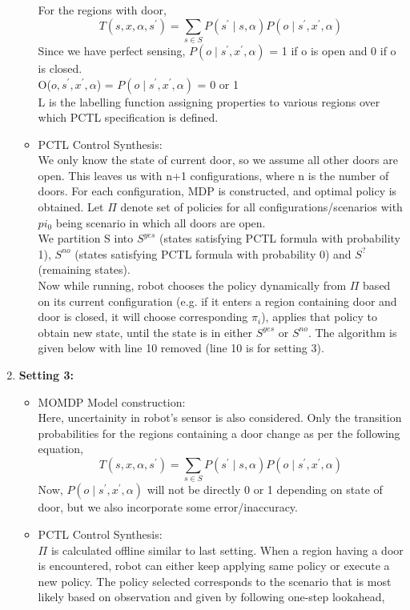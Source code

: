 \documentclass{article}
\theoremstyle{definition}
\begin{document}
\begin{enumerate}
\begin{itemize}
        For the regions with door,
        \[ T(s,x,\alpha,s^{'}) = \sum_{s\in S} P(s^{'}\mid s,\alpha) P(o \mid s^{'},x^{'},\alpha) \]
        Since we have perfect sensing, $P(o \mid s^{'},x^{'},\alpha)$ = 1 if o is open and 0 if o is closed.\\
        O($o, s^{'},x^{'},\alpha$) = $P(o \mid s^{'},x^{'},\alpha)$ = 0 or 1\\
        L is the labelling function assigning properties to various regions over which PCTL specification is defined.
        \item PCTL Control Synthesis:\\
        We only know the state of current door, so we assume all other doors are open. This leaves us with n+1 configurations, where n is the number of doors. For each configuration, MDP is constructed, and optimal policy is obtained. Let $\Pi$ denote set of policies for all configurations/scenarios with $pi_0$ being scenario in which all doors are open.\\
        We partition S into $S^{yes}$ (states satisfying PCTL formula with probability 1), $S^{no}$ (states satisfying PCTL formula with probability 0) and $S^{?}$ (remaining states).\\
        Now while running, robot chooses the policy dynamically from $\Pi$ based on its current configuration (e.g. if it enters a region containing door and door is closed, it will choose corresponding $\pi_i$), applies that policy to obtain new state, until the state is in either $S^{yes}$ or $S^{no}$. The algorithm is given below with line 10 removed (line 10 is for setting 3).\\
    \end{itemize}
    \item \textbf{Setting 3:}
    \begin{itemize}
        \item MOMDP Model construction:\\
        Here, uncertainity in robot's sensor is also considered.
        Only the transition probabilities for the regions containing a door change as per the following equation,
        \[ T(s,x,\alpha,s^{'}) = \sum_{s\in S} P(s^{'}\mid s,\alpha) P(o \mid s^{'},x^{'},\alpha) \]
        Now, $P(o \mid s^{'},x^{'},\alpha)$ will not be directly 0 or 1 depending on state of door, but we also incorporate some error/inaccuracy.
        \item PCTL Control Synthesis:\\
        $\Pi$ is calculated offline similar to last setting. When a region having a door is encountered, robot can either keep applying same policy or execute a new policy. The policy selected corresponds to the scenario that is most likely based on observation and given by following one-step lookahead,

\end{itemize}
\end{enumerate}
\end{document}

